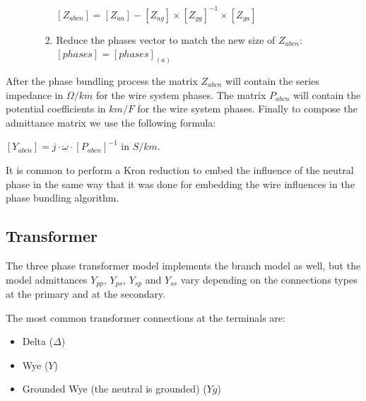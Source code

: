 \documentclass[nols,a4paper,twoside,notoc,fleqn]{tufte-book}
\begin{document}
\begin{enumerate}
\begin{enumerate}
\begin{enumerate}
			$\left[Z_{abcn}\right] = \left[Z_{aa}\right] - \left[Z_{ag}\right] \times \left[Z_{gg}\right]^{-1} \times \left[Z_{ga}\right]$
			
			\item Reduce the phases vector to match the  new size of $Z_{abcn}$:\\
			$\left[phases\right] = \left[phases\right]_{(a)}$
			
		\end{enumerate}
		
	\end{enumerate}
	
\end{enumerate}

After the phase bundling process the matrix $Z_{abcn}$  will contain the series impedance in $\Omega/km$ for the wire system phases. The matrix $P_{abcn}$ will contain the potential coefficients in $km/F$ for the wire system phases.  Finally to compose the admittance matrix we use the following formula: \\


 \vspace{0.3cm}
$
\left[Y_{abcn} \right] = j \cdot \omega \cdot \left[ P_{abcn} \right]^{-1}
$ in $S/km$.\\
 
 \vspace{0.3cm}
 
It is common to perform a Kron reduction to embed the influence of the neutral phase in the same way that it was done for embedding the wire influences in the phase bundling algorithm.


\subsection{Transformer}

The three phase transformer model implements the branch model as well, but the model admittances $Y_{pp}$, $Y_{ps}$, $Y_{sp}$ and $Y_{ss}$ vary depending on the connections types at the primary and at the secondary.

The most common transformer connections at the terminals are:

\begin{itemize}
	\item Delta ($\Delta$)
	\item Wye ($Y$)
	\item Grounded Wye (the neutral is grounded) ($Yg$)
\end{itemize}
\end{document}
